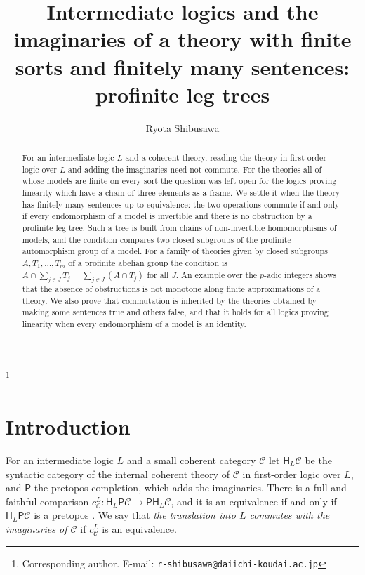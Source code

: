 \documentclass[11pt]{amsart}
\theoremstyle{definition}
\newcommand{\PP}{\mathsf P}
\newcommand{\HH}{\mathsf H}
\newcommand{\cC}{\mathcal C}
\begin{document}
\title[Finite sorts and finitely many sentences]{Intermediate logics
and the imaginaries of a theory with finite sorts and finitely many
sentences: profinite leg trees}
\author{Ryota Shibusawa}
\thanks{Corresponding author. E-mail: \texttt{r-shibusawa@daiichi-koudai.ac.jp}}
\address{Daiichi Institute of Technology}

\begin{abstract}
For an intermediate logic $L$ and a coherent theory, reading the
theory in first-order logic over $L$ and adding the imaginaries need
not commute. For the theories all of whose models are finite on every
sort the question was left open for the logics proving linearity which
have a chain of three elements as a frame. We settle it when the
theory has finitely many sentences up to equivalence: the two
operations commute if and only if every endomorphism of a model is invertible and there is no
obstruction by a profinite leg tree. Such a tree is built from chains
of non-invertible homomorphisms of models, and the condition compares
two closed subgroups of the profinite automorphism group of a model.
For a family of theories given by closed subgroups $A,T_1,\dots,T_m$
of a profinite abelian group the condition is $A\cap\sum_{j\in
J}T_j=\sum_{j\in J}(A\cap T_j)$ for all $J$. An example over the
$p$-adic integers shows that the absence of obstructions is not
monotone along finite approximations of a theory. We also prove that
commutation is inherited by the theories obtained by making some
sentences true and others false, and that it holds for all logics
proving linearity when every endomorphism of a model is an identity.
\end{abstract}

\maketitle

\section{Introduction}

For an intermediate logic $L$ and a small coherent category $\cC$ let
$\HH_L\cC$ be the syntactic category of the internal coherent theory of
$\cC$ in first-order logic over $L$, and $\PP$ the pretopos completion,
which adds the imaginaries. There is a full and faithful comparison
$c^L_\cC\colon\HH_L\PP\cC\to\PP\HH_L\cC$, and it is an equivalence if
and only if $\HH_L\PP\cC$ is a pretopos \cite[Lemma~2.2]{Interm}. We
say that \emph{the translation into $L$ commutes with the imaginaries
of $\cC$} if $c^L_\cC$ is an equivalence.
\end{document}
